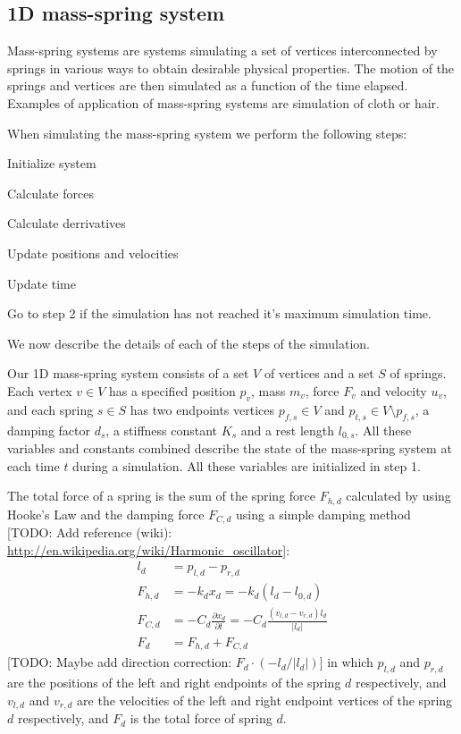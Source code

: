 \documentclass[twoside]{article}
\providecommand{\abs}[1]{\left \lvert #1 \right \rvert}
\begin{document}
\begin{multicols}{2}
\subsection{1D mass-spring system}
Mass-spring systems are systems simulating a set of vertices interconnected by
springs in various ways to obtain desirable physical properties. The motion of
the springs and vertices are then simulated as a function of the time elapsed.
Examples of application of mass-spring systems are simulation of cloth or hair.

When simulating the mass-spring system we perform the following steps:
\begin{compactenum}
    \item Initialize system
    \item Calculate forces
    \item Calculate derrivatives
    \item Update positions and velocities
    \item Update time
    \item Go to step 2 if the simulation has not reached it's maximum simulation
        time.
\end{compactenum}
We now describe the details of each of the steps of the simulation.

Our 1D mass-spring system consists of a set $V$ of vertices and a set $S$ of
springs. Each vertex $v \in V$ has a specified position $p_v$, mass $m_v$, force
$F_v$
and velocity $u_v$, and each spring $s \in S$ has two endpoints vertices $p_{f,s} \in V$
and $p_{t,s} \in V \setminus p_{f,s}$, a damping factor $d_s$, a stiffness
constant $K_s$ and a rest length $l_{0,s}$. All these variables and
constants combined describe the state of the mass-spring system at each time $t$ during a
simulation. All these variables are initialized in step 1.

The total force of a spring is the sum of the
spring force $F_{h,d}$ calculated by using Hooke's Law and the damping force
$F_{C,d}$ using a simple damping method [TODO: Add reference (wiki):
\url{http://en.wikipedia.org/wiki/Harmonic_oscillator}]:
\begin{align}
    \nonumber l_d &= p_{l,d} - p_{r,d} \\
    \label{eq:hooke}
    F_{h,d} &= -k_d x_d = -k_d (l_d - l_{0,d}) \\
    \label{eq:damping}
    F_{C,d} &= -C_d \frac{\partial x_d}{ \partial t} = - C_d
        \frac{\left(v_{l,d} - v_{r,d}\right) l_d}{\abs{l_d}} \\
    F_d &= F_{h,d} + F_{C,d}
\end{align}
[TODO: Maybe add direction correction: $F_d \cdot (-l_d / \abs{l_d})$]
in which $p_{l,d}$ and $p_{r,d}$ are the positions of the left and right
endpoints of the spring $d$ respectively, and $v_{l,d}$ and $v_{r,d}$ are
the velocities of the left and right endpoint vertices of the spring $d$
respectively, and $F_d$ is the total force of spring $d$.


\end{multicols}
\end{document}
